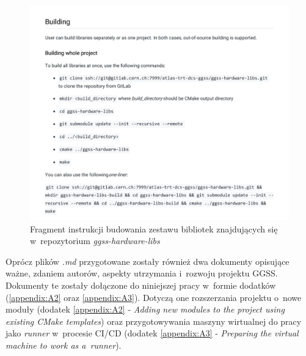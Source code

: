 \begin{figure}
\centering
\caption{Fragment instrukcji budowania zestawu bibliotek znajdujących się w~repozytorium \textit{ggss-hardware-libs}}
\label{fig:markdownHardware}
\includegraphics[width=\textwidth]{res/HardwareLibs}
\end{figure}

Oprócz plików \textit{.md} przygotowane zostały również dwa dokumenty opisujące ważne, zdaniem autorów, aspekty utrzymania i~rozwoju projektu GGSS. Dokumenty te zostały dołączone do niniejszej pracy w~formie dodatków (\ref{appendix:A2} oraz \ref{appendix:A3}). Dotyczą one rozszerzania projektu o~nowe moduły (dodatek \ref{appendix:A2} - \textit{Adding new modules to the project using existing CMake
templates}) oraz przygotowywania maszyny wirtualnej do pracy jako \textit{runner} w~procesie CI/CD (dodatek \ref{appendix:A3} - \textit{Preparing the virtual machine to work as a~runner}). 

